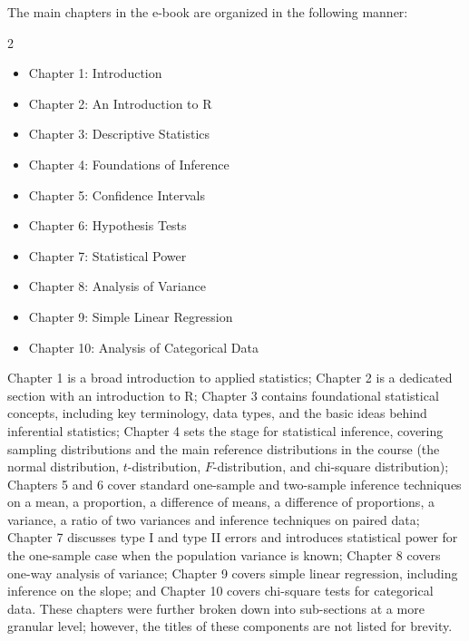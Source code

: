 \documentclass[11pt]{article}
\begin{document}
The main chapters in the e-book are organized in the following manner:
\setlength{\columnsep}{-100pt}
\begin{multicols}{2}
\setlength{\columnsep}{30pt}
\begin{itemize}[itemsep=-2.0pt, topsep=-5pt]
\item	Chapter 1: Introduction
\item	Chapter 2: An Introduction to R
\item	Chapter 3: Descriptive Statistics
\item	Chapter 4: Foundations of Inference
\item	Chapter 5: Confidence Intervals
\item	Chapter 6: Hypothesis Tests
\item	Chapter 7: Statistical Power
\item	Chapter 8: Analysis of Variance
\item	Chapter 9: Simple Linear Regression
\item	Chapter 10: Analysis of Categorical Data
\end{itemize}
\end{multicols}

Chapter 1 is a broad introduction to applied statistics;
Chapter 2 is a dedicated section with an introduction to R;
Chapter 3 contains foundational statistical concepts, including key terminology, data types, and the basic ideas behind inferential statistics;
Chapter 4 sets the stage for statistical inference, covering sampling distributions and the main reference distributions in the course (the normal distribution, $t$-distribution, $F$-distribution, and chi-square distribution);
Chapters 5 and 6 cover standard one-sample and two-sample inference techniques on a mean, a proportion, a difference of means, a difference of proportions, a variance, a ratio of two variances and inference techniques on paired data;
Chapter 7 discusses type I and type II errors and introduces statistical power for the one-sample case when the population variance is known;
Chapter 8 covers one-way analysis of variance;
Chapter 9 covers simple linear regression, including inference on the slope; and
Chapter 10 covers chi-square tests for categorical data.
These chapters were further broken down into sub-sections at a more granular level; however, the titles of these components are not listed for brevity.
\end{document}
